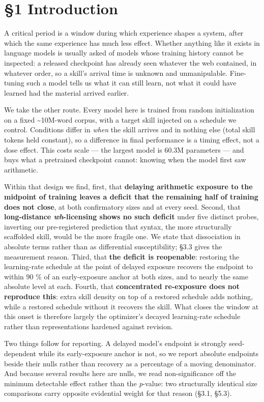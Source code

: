 \documentclass[11pt]{article}
\begin{document}
\section{§1 Introduction}\label{introduction}

A critical period is a window during which experience shapes a system, after which the same
experience has much less effect. Whether anything like it exists in language models is
usually asked of models whose training history cannot be inspected: a released checkpoint
has already seen whatever the web contained, in whatever order, so a skill's arrival time is
unknown and unmanipulable. Fine-tuning such a model tells us what it can still learn, not
what it could have learned had the material arrived earlier.

We take the other route. Every model here is trained from random initialization on a fixed
\textasciitilde10M-word corpus, with a target skill injected on a schedule we control. Conditions differ
in \emph{when} the skill arrives and in nothing else (total skill tokens held constant), so a
difference in final performance is a timing effect, not a dose effect. This costs scale —
the largest model is 60.3M parameters — and buys what a pretrained checkpoint cannot:
knowing when the model first saw arithmetic.

Within that design we find, first, that \textbf{delaying arithmetic exposure to the midpoint of
training leaves a deficit that the remaining half of training does not close}, at both
confirmatory sizes and at every seed. Second, that \textbf{long-distance \emph{wh}-licensing shows no
such deficit} under five distinct probes, inverting our pre-registered prediction that
syntax, the more structurally scaffolded skill, would be the more fragile one. We state that
dissociation in absolute terms rather than as differential susceptibility; §3.3 gives the
measurement reason. Third, that \textbf{the deficit is reopenable}: restoring the learning-rate
schedule at the point of delayed exposure recovers the endpoint to within 90 \% of an
early-exposure anchor at both sizes, and to nearly the same absolute level at each. Fourth,
that \textbf{concentrated re-exposure does not reproduce this}: extra skill density on top of a
restored schedule adds nothing, while a restored schedule without it recovers the skill.
What closes the window at this onset is therefore largely the optimizer's decayed
learning-rate schedule rather than representations hardened against revision.

Two things follow for reporting. A delayed model's endpoint is strongly seed-dependent while
its early-exposure anchor is not, so we report absolute endpoints beside their nulls rather
than recovery as a percentage of a moving denominator. And because several results here are
nulls, we read non-significance off the minimum detectable effect rather than the
\emph{p}-value: two structurally identical size comparisons carry opposite evidential weight for
that reason (§3.1, §5.3).
\end{document}

